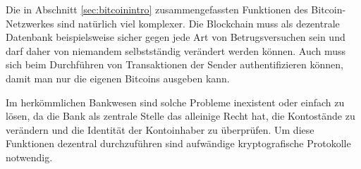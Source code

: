 Die in Abschnitt \ref{sec:bitcoinintro} zusammengefassten Funktionen des Bitcoin-Netzwerkes sind natürlich viel komplexer.
Die Blockchain muss als dezentrale Datenbank beispielsweise sicher gegen jede Art von Betrugsversuchen sein und darf daher von niemandem selbstständig verändert werden können.
Auch muss sich beim Durchführen von Transaktionen der Sender authentifizieren können, damit man nur die eigenen Bitcoins ausgeben kann.

Im herkömmlichen Bankwesen sind solche Probleme inexistent oder einfach zu lösen, da die Bank als zentrale Stelle das alleinige Recht hat, die Kontostände zu verändern und die Identität der Kontoinhaber zu überprüfen.
Um diese Funktionen dezentral durchzuführen sind aufwändige kryptografische Protokolle notwendig.
